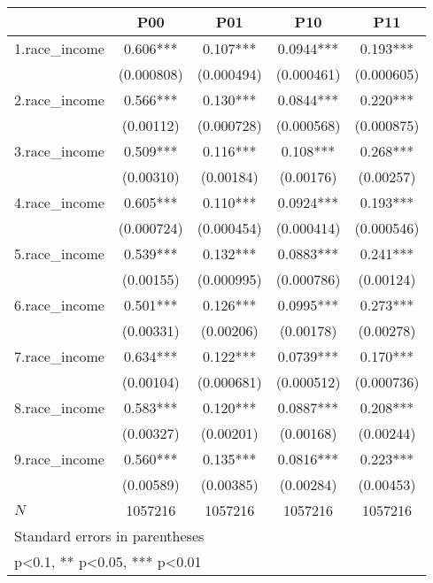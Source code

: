 {
\def\sym#1{\ifmmode^{#1}\else\(^{#1}\)\fi}
\begin{tabular}{l*{4}{c}}
\hline\hline
            &\multicolumn{1}{c}{P00}&\multicolumn{1}{c}{P01}&\multicolumn{1}{c}{P10}&\multicolumn{1}{c}{P11}\\
\hline
1.race\_income&       0.606***&       0.107***&      0.0944***&       0.193***\\
            &  (0.000808)   &  (0.000494)   &  (0.000461)   &  (0.000605)   \\
[1em]
2.race\_income&       0.566***&       0.130***&      0.0844***&       0.220***\\
            &   (0.00112)   &  (0.000728)   &  (0.000568)   &  (0.000875)   \\
[1em]
3.race\_income&       0.509***&       0.116***&       0.108***&       0.268***\\
            &   (0.00310)   &   (0.00184)   &   (0.00176)   &   (0.00257)   \\
[1em]
4.race\_income&       0.605***&       0.110***&      0.0924***&       0.193***\\
            &  (0.000724)   &  (0.000454)   &  (0.000414)   &  (0.000546)   \\
[1em]
5.race\_income&       0.539***&       0.132***&      0.0883***&       0.241***\\
            &   (0.00155)   &  (0.000995)   &  (0.000786)   &   (0.00124)   \\
[1em]
6.race\_income&       0.501***&       0.126***&      0.0995***&       0.273***\\
            &   (0.00331)   &   (0.00206)   &   (0.00178)   &   (0.00278)   \\
[1em]
7.race\_income&       0.634***&       0.122***&      0.0739***&       0.170***\\
            &   (0.00104)   &  (0.000681)   &  (0.000512)   &  (0.000736)   \\
[1em]
8.race\_income&       0.583***&       0.120***&      0.0887***&       0.208***\\
            &   (0.00327)   &   (0.00201)   &   (0.00168)   &   (0.00244)   \\
[1em]
9.race\_income&       0.560***&       0.135***&      0.0816***&       0.223***\\
            &   (0.00589)   &   (0.00385)   &   (0.00284)   &   (0.00453)   \\
\hline
\(N\)       &     1057216   &     1057216   &     1057216   &     1057216   \\
\hline\hline
\multicolumn{5}{l}{\footnotesize Standard errors in parentheses}\\
\multicolumn{5}{l}{\footnotesize * p<0.1, ** p<0.05, *** p<0.01}\\
\end{tabular}
}
